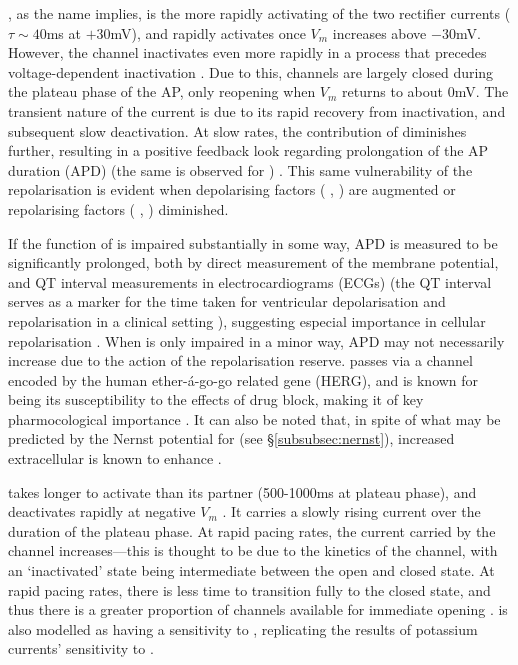 \documentclass[../thesis-main.tex]{subfiles}
\begin{document}
 \ikr{}, as the name implies, is the more rapidly activating of the two rectifier \K{} currents ($\tau\sim40$ms at $+30$mV), and rapidly activates once $V_m$ increases above $-30$mV. However, the channel inactivates even more rapidly in a process that precedes voltage-dependent inactivation \citep{Varro2011, Spector1996, Carmeliet2006}. Due to this, \ikr{} channels are largely closed during the plateau phase of the AP, only reopening when $V_m$ returns to about 0mV. The transient nature of the current is due to its rapid recovery from inactivation, and subsequent slow deactivation. At slow rates, the contribution of \ikr{} diminishes further, resulting in a positive feedback look regarding prolongation of the AP duration (APD) (the same is observed for \ikix{}) \citep{Virag2009}. This same vulnerability of the repolarisation is evident when depolarising factors (\eg{} \ina{}, \ica{}) are augmented or repolarising factors (\eg{} \iks{}, \ikix{}) diminished.
 
 If the function of \ikr{} is impaired substantially in some way, APD is measured to be significantly prolonged, both by direct measurement of the membrane potential, and QT interval measurements in electrocardiograms (ECGs)  (the QT interval serves as a marker for the time taken for ventricular depolarisation and repolarisation in a clinical setting \citep{Yan1998}), suggesting especial importance in cellular repolarisation \citep{Varro2000, Lengyel2001, Jost2005}. When \ikr{} is only impaired in a minor way, APD may not necessarily increase due to the action of the repolarisation reserve. \ikr{} passes via a channel encoded by the human ether-\'a-go-go related gene (HERG), and is known for being its susceptibility to the effects of drug block, making it of key pharmocological importance \citep{Vandenberg2001, Haverkamp2000}. It can also be noted that, in spite of what may be predicted by the Nernst potential for \ikr{} (see \S\ref{subsubsec:nernst}), increased extracellular \K{} is known to enhance \ikr{} \citep{Sanguinetti1992, Yang1997}.
 
 \iks{} takes longer to activate than its partner (500-1000ms at plateau phase), and deactivates rapidly at negative $V_m$ \citep{Jost2005, Varro2011}. It carries a slowly rising current over the duration of the plateau phase. At rapid pacing rates, the current carried by the \iks{} channel increases---this is thought to be due to the kinetics of the channel, with an `inactivated' state being intermediate between the open and closed state. At rapid pacing rates, there is less time to transition fully to the closed state, and thus there is a greater proportion of \iks{} channels available for immediate opening \citep{Silva2005}. \iks{} is also modelled as having a sensitivity to \cai{}, replicating the results of potassium currents' sensitivity to \cai{} \citep{Meech1975}.
 
\end{document}
